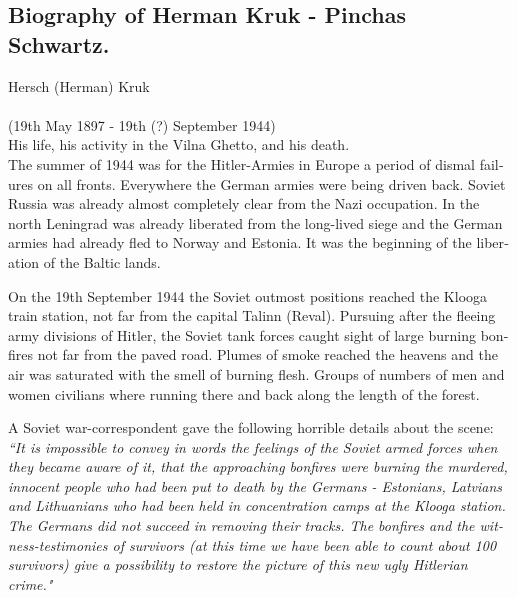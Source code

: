 \documentclass{article}
\begin{document}
\begin{pairs}
\begin{Rightside}
\begin{RTL}
\begin{hebrew}
\endnumbering
\end{hebrew}
\end{RTL}
\end{Rightside}


\begin{Leftside}
\begin{english}
\section{
Biography of Herman Kruk - Pinchas Schwartz. \\    }
\beginnumbering
\autopar

Hersch (Herman) Kruk \\ \\ (19th May 1897 - 19th (?) September 1944) \\ 

His life, his activity in the Vilna Ghetto, and his death. \\

The summer of 1944 was for the Hitler-Armies in Europe a period
of dismal failures on all fronts. Everywhere the German armies 
were being driven back. Soviet Russia was already almost completely
clear from the Nazi occupation. In the north Leningrad was already
liberated from the long-lived siege and the German armies had already
fled to Norway and Estonia. It was the beginning of the liberation of the Baltic
lands.

On the 19th September 1944 the Soviet outmost positions reached the Klooga train station,
not far from the capital Talinn (Reval). Pursuing after the fleeing army divisions of Hitler, the
Soviet tank forces caught sight of large burning bonfires not far from the paved road.  Plumes
of smoke reached the heavens and the air was saturated with the smell of burning flesh. Groups of numbers of
men and women civilians where running there and back along the length of the forest.

A Soviet war-correspondent gave the following horrible details about the scene:
\emph{``It is impossible to convey in words the feelings of the Soviet armed forces when they
became aware of it, that the approaching bonfires were burning the murdered, innocent people who
had been put to death by the Germans - Estonians, Latvians and Lithuanians who had been held in
concentration camps at the Klooga station. The Germans did not succeed in removing their tracks.
The bonfires and the witness-testimonies of survivors 
(at this time we have been able to count about 100 survivors) give a possibility to restore the picture
of this new ugly Hitlerian crime."}


\end{english}
\end{Leftside}
\end{pairs}
\end{document}
